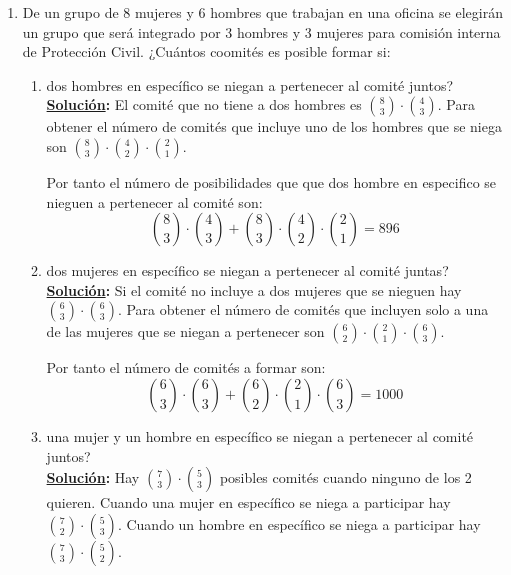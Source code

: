 \documentclass[11pt,letterpaper]{report}
\newcommand{\sol}{\textbf{\underline{Solución}: }} %
\begin{document}
\begin{enumerate}
\begin{enumerate}[label=\alph*)]
\begin{proof}
        O de manera análoga, primero seleccionar al presidente con $n$ posibles
        opciones, y después seleccionar a lo miembros restantes en $2^{n-1}$
        maneras. Dando un total de $n \cdot 2^{n-1}$ formas de tomar un comité.

        Teniendo así la igualdad:
        $$\sum_{k=1}^{n} k \cdot \binom{n}{k} = n \cdot 2^{n-1}$$
    \end{proof}
\end{enumerate}

\item De un grupo de 8 mujeres y 6 hombres que trabajan en una oficina se elegirán un grupo que será
integrado por 3 hombres y 3 mujeres para comisión interna de Protección Civil. ¿Cuántos coomités
es posible formar si:
\begin{enumerate}[label=\alph*)]
    \item dos hombres en específico se niegan a pertenecer al comité juntos?\\
    \sol El comité que no tiene a dos hombres es
    $\binom{8}{3} \cdot \binom{4}{3}$. Para obtener el número de comités que
    incluye uno de los hombres que se niega son
    $\binom{8}{3} \cdot \binom{4}{2} \cdot \binom{2}{1}$.

    Por tanto el número de posibilidades que que dos hombre en especifico se nieguen a
    pertenecer al comité son:
    $$\binom{8}{3} \cdot \binom{4}{3} + \binom{8}{3} \cdot \binom{4}{2} \cdot \binom{2}{1} = 896$$


    \item dos mujeres en específico se niegan a pertenecer al comité juntas?\\
    \sol Si el comité no incluye a dos mujeres que se nieguen hay
    $\binom{6}{3} \cdot \binom{6}{3}$. Para obtener el número de comités que incluyen
    solo a una de las mujeres que se niegan a pertenecer son
    $\binom{6}{2} \cdot \binom{2}{1} \cdot \binom{6}{3}$.

    Por tanto el número de comités a formar son:
    $$\binom{6}{3} \cdot \binom{6}{3} +\binom{6}{2} \cdot \binom{2}{1} \cdot \binom{6}{3} = 1000$$

    \item una mujer y un hombre en específico se niegan a pertenecer al comité juntos?\\
    \sol Hay $\binom{7}{3} \cdot \binom{5}{3}$ posibles comités cuando ninguno de los
    2 quieren. Cuando una mujer en específico se niega a participar hay
    $\binom{7}{2} \cdot \binom{5}{3}$. Cuando un hombre en específico se niega a
    participar hay $\binom{7}{3} \cdot \binom{5}{2}$.


\end{enumerate}
\end{enumerate}
\end{document}
